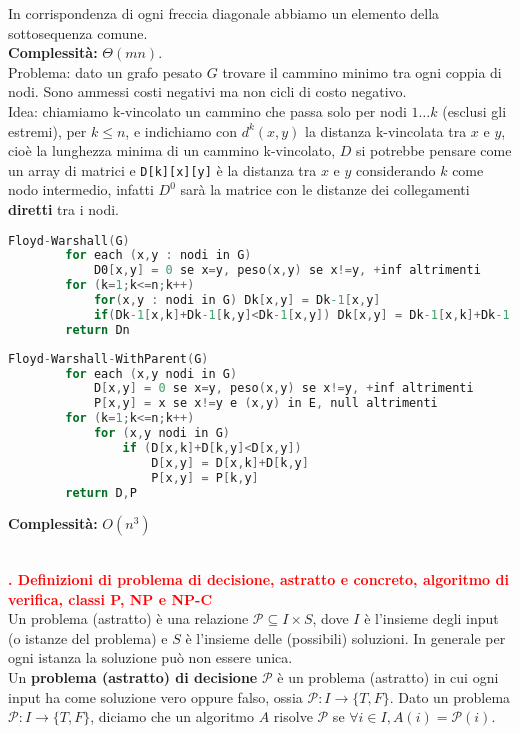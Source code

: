 \documentclass[12pt]{article}
\newcounter{questioncounter}
\newcommand{\question}[1]{
    \stepcounter{questioncounter}
    \textbf{\\\textcolor{red}{\arabic{questioncounter}. #1}}\\
}
\begin{document}
In corrispondenza di ogni freccia diagonale abbiamo un elemento della sottosequenza comune.\\
\textbf{Complessità:} $\Theta(mn)$.\\
Problema: dato un grafo pesato $G$ trovare il cammino minimo tra ogni coppia di nodi. Sono ammessi costi negativi ma non cicli di costo negativo.\\
Idea: chiamiamo k-vincolato un cammino che passa solo per nodi $1\ldots k$ (esclusi gli estremi), per $k\leq n$, e indichiamo con $d^{k}(x,y)$ la distanza k-vincolata tra $x$ e $y$, cioè la lunghezza minima di un cammino k-vincolato, $D$ si potrebbe pensare come un array di matrici e \texttt{D[k][x][y]} è la distanza tra $x$ e $y$ considerando $k$ come nodo intermedio, infatti $D^{0}$ sarà la matrice con le distanze dei collegamenti \textbf{diretti} tra i nodi. 
\begin{lstlisting}[language=C]
    Floyd-Warshall(G)
        for each (x,y : nodi in G)
            D0[x,y] = 0 se x=y, peso(x,y) se x!=y, +inf altrimenti
        for (k=1;k<=n;k++)
            for(x,y : nodi in G) Dk[x,y] = Dk-1[x,y]
            if(Dk-1[x,k]+Dk-1[k,y]<Dk-1[x,y]) Dk[x,y] = Dk-1[x,k]+Dk-1[k,y]
        return Dn
\end{lstlisting}
\begin{lstlisting}[language=C]
    Floyd-Warshall-WithParent(G)
        for each (x,y nodi in G)
            D[x,y] = 0 se x=y, peso(x,y) se x!=y, +inf altrimenti
            P[x,y] = x se x!=y e (x,y) in E, null altrimenti
        for (k=1;k<=n;k++)
            for (x,y nodi in G)
                if (D[x,k]+D[k,y]<D[x,y])
                    D[x,y] = D[x,k]+D[k,y]
                    P[x,y] = P[k,y]
        return D,P
\end{lstlisting}
\textbf{Complessità:} $O(n^{3})$
\question{Definizioni di problema di decisione, astratto e concreto, algoritmo di verifica, classi P, NP e NP-C}
Un problema (astratto) è una relazione $\mathcal{P}\subseteq I\times S$, dove $I$ è l'insieme degli input (o istanze del problema) e $S$ è l'insieme delle (possibili) soluzioni. In generale per ogni istanza la soluzione può non essere unica.\\
Un \textbf{problema (astratto) di decisione} $\mathcal{P}$ è un problema (astratto) in cui ogni input ha come soluzione vero oppure falso, ossia $\mathcal{P}:I\rightarrow \{T,F\}$. Dato un problema $\mathcal{P}:I\rightarrow \{T,F\}$, diciamo che un algoritmo $A$ risolve $\mathcal{P}$ se $\forall i\in I, A(i)=\mathcal{P}(i)$.\\
\end{document}
